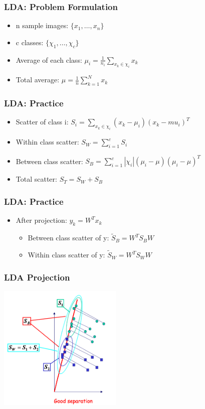 \documentclass[10pt]{beamer}
\begin{document}
\begin{frame}
  \frametitle{LDA: Problem Formulation}
  \begin{itemize}
  \item n sample images: \hfill $ \{ x_1, \ldots, x_n \} $
  \item c classes: \hfill $ \{ \chi_1, \ldots, \chi_c \} $
  \item Average of each class: \hfill  $ \mu_i = \frac{1}{n_i} \sum_{x_k \in \chi_i} x_k $
  \item Total average: \hfill $\mu = \frac{1}{n} \sum_{k=1}^N x_k $
  \end{itemize}
\end{frame}

\begin{frame}
  \frametitle{LDA: Practice}
  \begin{itemize}
  \item Scatter of class i: \hfill $ S_i = \sum_{x_k \in \chi_i} (x_k - \mu_i)(x_k - mu_i)^T$
  \item Within class scatter: \hfill $ S_W = \sum_{i=1}^c S_i$
  \item Between class scatter: \hfill $S_B = \sum_{i=1}^c |\chi_i|(\mu_i - \mu)(\mu_i - \mu)^T$
  \item Total scatter: \hfill $S_T = S_W + S_B$
  \end{itemize}  
\end{frame}

\begin{frame}
  \frametitle{LDA: Practice}
  \begin{itemize}
  \item After projection: $ y_k = W^T x_k $
    \begin{itemize}
    \item Between class scatter of y: $\tilde{S}_B = W^T S_B W$
    \item Within class scatter of y: $\tilde{S}_W = W^T S_W W$
    \end{itemize}
  \end{itemize}
\end{frame}

\begin{frame}
  \frametitle{LDA Projection}
  \centerline{\includegraphics[height=6cm]{lda-projection}}
\end{frame}
\end{document}
